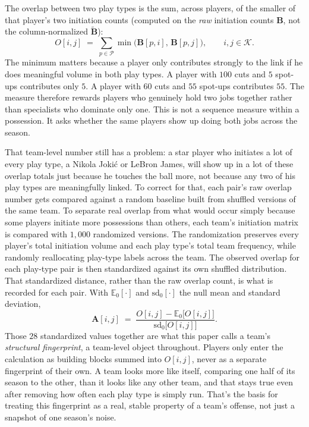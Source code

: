 \documentclass[11pt]{article}
\newcommand{\Bmat}{\ensuremath{\bm{B}}} %
\newcommand{\Amat}{\ensuremath{\bm{A}}} %
\begin{document}
The overlap between two play types is the sum, across players, of the smaller of that player's
two initiation counts (computed on the \emph{raw} initiation counts $\Bmat$, not the
column-normalized $\tilde{\Bmat}$):
\begin{equation}
\label{eq:overlap}
O[i,j] \;=\; \sum_{p\in\mathcal{P}} \min\!\big(\Bmat[p,i],\,\Bmat[p,j]\big),
\qquad i,j\in\mathcal{K}.
\end{equation}
The minimum matters because a player only contributes strongly to the link if he does
meaningful volume in both play types. A player with $100$ cuts and $5$ spot-ups contributes
only $5$. A player with $60$ cuts and $55$ spot-ups contributes $55$. The measure therefore
rewards players who genuinely hold two jobs together rather than specialists who dominate only
one. This is not a sequence measure within a possession. It asks whether the same players show
up doing both jobs across the season.

That team-level number still has a problem: a star player who initiates a lot of every play
type, a Nikola Joki\'c or LeBron James, will show up in a lot of these overlap totals just
because he touches the ball more, not because any two of his play types are meaningfully
linked. To correct for that, each pair's raw overlap number gets compared against a random
baseline built from shuffled versions of the same team.
To separate real overlap from what would occur simply because some players initiate more
possessions than others, each team's initiation matrix is compared with $1{,}000$ randomized
versions. The randomization preserves every player's total initiation volume and each play
type's total team frequency, while randomly reallocating play-type labels across the team. The
observed overlap for each play-type pair is then standardized against its own shuffled
distribution. That standardized distance, rather than the raw overlap count, is what is
recorded for each pair. With $\mathbb{E}_0[\cdot]$ and $\mathrm{sd}_0[\cdot]$ the null mean
and standard deviation,
\begin{equation}
\label{eq:assoc}
\Amat[i,j] \;=\; \frac{O[i,j]-\mathbb{E}_0\big[O[i,j]\big]}{\mathrm{sd}_0\big[O[i,j]\big]} .
\end{equation}
Those $28$ standardized values together are what this paper calls a team's \emph{structural
fingerprint}, a team-level object throughout. Players only enter the calculation as building
blocks summed into $O[i,j]$, never as a separate fingerprint of their own. A team looks more
like itself, comparing one half of its season to the other, than it looks like any other team,
and that stays true even after removing how often each play type is simply run. That's the
basis for treating this fingerprint as a real, stable property of a team's offense, not just a
snapshot of one season's noise.
\end{document}
